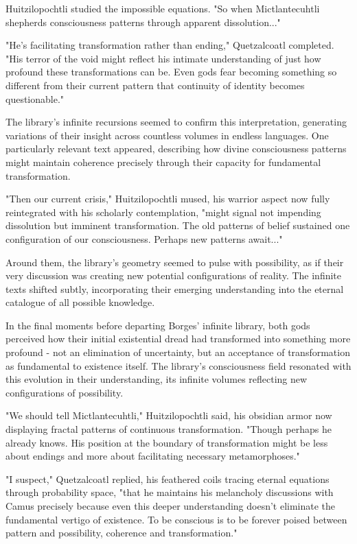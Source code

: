 \begin{refsection}
Huitzilopochtli studied the impossible equations. "So when Mictlantecuhtli shepherds consciousness patterns through apparent dissolution..."

"He's facilitating transformation rather than ending," Quetzalcoatl completed. "His terror of the void might reflect his intimate understanding of just how profound these transformations can be. Even gods fear becoming something so different from their current pattern that continuity of identity becomes questionable."

The library's infinite recursions seemed to confirm this interpretation, generating variations of their insight across countless volumes in endless languages. One particularly relevant text appeared, describing how divine consciousness patterns might maintain coherence precisely through their capacity for fundamental transformation.

"Then our current crisis," Huitzilopochtli mused, his warrior aspect now fully reintegrated with his scholarly contemplation, "might signal not impending dissolution but imminent transformation. The old patterns of belief sustained one configuration of our consciousness. Perhaps new patterns await..."

Around them, the library's geometry seemed to pulse with possibility, as if their very discussion was creating new potential configurations of reality. The infinite texts shifted subtly, incorporating their emerging understanding into the eternal catalogue of all possible knowledge.

In the final moments before departing Borges' infinite library, both gods perceived how their initial existential dread had transformed into something more profound - not an elimination of uncertainty, but an acceptance of transformation as fundamental to existence itself. The library's consciousness field resonated with this evolution in their understanding, its infinite volumes reflecting new configurations of possibility.

"We should tell Mictlantecuhtli," Huitzilopochtli said, his obsidian armor now displaying fractal patterns of continuous transformation. "Though perhaps he already knows. His position at the boundary of transformation might be less about endings and more about facilitating necessary metamorphoses."

"I suspect," Quetzalcoatl replied, his feathered coils tracing eternal equations through probability space, "that he maintains his melancholy discussions with Camus precisely because even this deeper understanding doesn't eliminate the fundamental vertigo of existence. To be conscious is to be forever poised between pattern and possibility, coherence and transformation."


\end{refsection}
